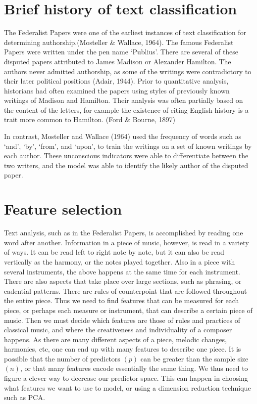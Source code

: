 \documentclass[12pt,twoside]{reedthesis}
\theoremstyle{definition}
\theoremstyle{definition}
\theoremstyle{definition}
\theoremstyle{remark}
\begin{document}
\section{Brief history of text
classification}\label{brief-history-of-text-classification}

The Federalist Papers were one of the earliest instances of text
classification for determining authorship.(Mosteller \& Wallace, 1964).
The famous Federalist Papers were written under the pen name `Publius'.
There are several of these disputed papers attributed to James Madison
or Alexander Hamilton. The authors never admitted authorship, as some of
the writings were contradictory to their later political positions
(Adair, 1944). Prior to quantitative analysis, historians had often
examined the papers using styles of previously known writings of Madison
and Hamilton. Their analysis was often partially based on the content of
the letters, for example the existence of citing English history is a
trait more common to Hamilton. (Ford \& Bourne, 1897)

In contrast, Mosteller and Wallace (1964) used the frequency of words
such as `and', `by', `from', and `upon', to train the writings on a set
of known writings by each author. These unconscious indicators were able
to differentiate between the two writers, and the model was able to
identify the likely author of the disputed paper.

\section{Feature selection}\label{feature-selection}

Text analysis, such as in the Federalist Papers, is accomplished by
reading one word after another. Information in a piece of music,
however, is read in a variety of ways. It can be read left to right note
by note, but it can also be read vertically as the harmony, or the notes
played together. Also in a piece with several instruments, the above
happens at the same time for each instrument. There are also aspects
that take place over large sections, such as phrasing, or cadential
patterns. There are rules of counterpoint that are followed throughout
the entire piece. Thus we need to find features that can be measured for
each piece, or perhaps each measure or instrument, that can describe a
certain piece of music. Then we must decide which features are those of
rules and practices of classical music, and where the creativeness and
individuality of a composer happens. As there are many different aspects
of a piece, melodic changes, harmonies, etc, one can end up with many
features to describe one piece. It is possible that the number of
predictors \((p)\) can be greater than the sample size \((n)\), or that
many features encode essentially the same thing. We thus need to figure
a clever way to decrease our predictor space. This can happen in
choosing what features we want to use to model, or using a dimension
reduction technique such as PCA.
\end{document}
